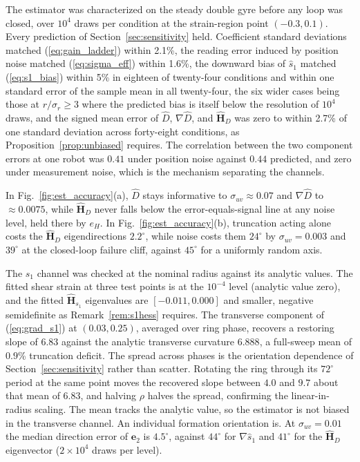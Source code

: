 \documentclass[lettersize,journal]{IEEEtran}
\begin{document}
The estimator was characterized on the steady double gyre before any loop
was closed, over $10^4$ draws per condition at the strain-region point
$(-0.3, 0.1)$. Every prediction of Section~\ref{sec:sensitivity} held.
Coefficient standard deviations matched (\ref{eq:gain_ladder}) within
2.1\%, the reading error induced by position noise matched
(\ref{eq:sigma_eff}) within 1.6\%, the downward bias of $\hat{s}_1$ matched
(\ref{eq:s1_bias}) within 5\% in eighteen of twenty-four conditions and
within one standard error of the sample mean in all twenty-four, the six
wider cases being those at $r/\sigma_r \geq 3$ where the predicted bias
is itself below the resolution of $10^4$ draws, and
the signed mean error of $\hat{D}$, $\nabla\hat{D}$, and
$\hat{\mathbf{H}}_D$ was zero to within 2.7\% of one standard deviation
across forty-eight conditions, as Proposition~\ref{prop:unbiased} requires.
The correlation between the two component errors at one robot was $0.41$
under position noise against $0.44$ predicted, and zero under measurement
noise, which is the mechanism separating the channels.

In Fig.~\ref{fig:est_accuracy}(a), $\hat{D}$ stays informative to
$\sigma_{uv} \approx 0.07$ and $\nabla\hat{D}$ to $\approx 0.0075$, while
$\hat{\mathbf{H}}_D$ never falls below the error-equals-signal line at any
noise level, held there by $e_H$. In Fig.~\ref{fig:est_accuracy}(b),
truncation acting alone costs the $\hat{\mathbf{H}}_D$ eigendirections
$2.2^\circ$, while noise costs them $24^\circ$ by $\sigma_{uv} = 0.003$ and
$39^\circ$ at the closed-loop failure cliff, against $45^\circ$ for a
uniformly random axis.

The $s_1$ channel was checked at the nominal radius against its analytic
values. The fitted shear strain at three test points is at the $10^{-4}$
level (analytic value zero), and the fitted $\hat{\mathbf{H}}_{s_1}$
eigenvalues are $[-0.011, 0.000]$ and smaller, negative semidefinite as
Remark~\ref{rem:s1hess} requires. The transverse component of
(\ref{eq:grad_s1}) at $(0.03, 0.25)$, averaged over ring phase, recovers a
restoring slope of $6.83$ against the analytic transverse curvature
$6.888$, a full-sweep mean of $0.9$\% truncation deficit. The spread
across phases is the orientation dependence of
Section~\ref{sec:sensitivity} rather than scatter. Rotating the ring
through its $72^\circ$ period at the same point moves the recovered slope
between $4.0$ and $9.7$ about that mean of $6.83$, and halving $\rho$ halves
the spread, confirming the linear-in-radius scaling. The mean tracks the
analytic value, so the estimator is not biased in the transverse channel.
An individual formation orientation is. At $\sigma_{uv} = 0.01$ the median
direction error of $\mathbf{e}_2$ is $4.5^\circ$, against $44^\circ$ for
$\nabla\hat{s}_1$ and $41^\circ$ for the $\hat{\mathbf{H}}_D$ eigenvector
($2\times 10^4$ draws per level).
\end{document}
